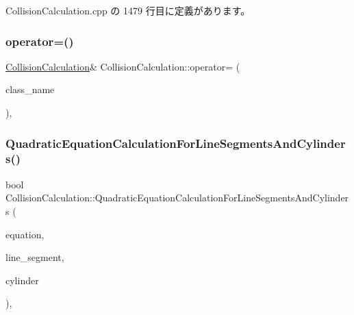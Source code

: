  Collision\+Calculation.\+cpp の 1479 行目に定義があります。

\mbox{\label{class_collision_calculation_a20738fa64ae8749165328d48ee90d32e}} 
\subsubsection{\texorpdfstring{operator=()}{operator=()}}
{\footnotesize\ttfamily \mbox{\hyperlink{class_collision_calculation}{Collision\+Calculation}}\& Collision\+Calculation\+::operator= (\begin{DoxyParamCaption}\item[{const \mbox{\hyperlink{class_collision_calculation}{Collision\+Calculation}} \&}]{class\+\_\+name }\end{DoxyParamCaption})\hspace{0.3cm}{\ttfamily [private]}, {\ttfamily [delete]}}

\mbox{\label{class_collision_calculation_a860cb4de288c1dbd5e21698b9f9a43d7}} 
\subsubsection{\texorpdfstring{Quadratic\+Equation\+Calculation\+For\+Line\+Segments\+And\+Cylinders()}{QuadraticEquationCalculationForLineSegmentsAndCylinders()}}
{\footnotesize\ttfamily bool Collision\+Calculation\+::\+Quadratic\+Equation\+Calculation\+For\+Line\+Segments\+And\+Cylinders (\begin{DoxyParamCaption}\item[{\mbox{\hyperlink{class_quadratic_equation}{Quadratic\+Equation}} $\ast$}]{equation,  }\item[{\mbox{\hyperlink{class_line_segment}{Line\+Segment}} $\ast$}]{line\+\_\+segment,  }\item[{\mbox{\hyperlink{class_cylinder}{Cylinder}} $\ast$}]{cylinder }\end{DoxyParamCaption})\hspace{0.3cm}{\ttfamily [static]}, {\ttfamily [private]}}



